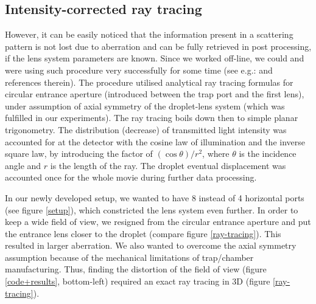 \documentclass[12pt,dvips]{elsarticle}
\begin{document}
\subsection{Intensity-corrected ray tracing} However, it can be easily noticed that the information present in a scattering
pattern is not lost due to aberration and can be fully retrieved in post processing, if the lens system parameters are
known. Since we worked off-line, we could and were using such procedure very successfully for some time (see e.g.:
\cite{RoP,liquids,HK-soft matter} and references therein). The procedure utilised analytical ray tracing formulas for
circular entrance aperture (introduced between the trap port and the first lens), under assumption of axial symmetry of
the droplet-lens system (which was fulfilled in our experiments). The ray tracing boils down then to simple planar
trigonometry. The distribution (decrease) of transmitted light intensity was accounted for at the detector with the cosine
law of illumination and the inverse square law, by introducing the factor of $(\cos \theta) /r^2$, where $\theta$ is the
incidence angle and $r$ is the length of the ray. The droplet eventual displacement was accounted once for the whole movie
during further data processing.

In our newly developed setup, we wanted to have 8 instead of 4 horizontal ports (see figure \ref{setup}), which
constricted the lens system even further. In order to keep a wide field of view, we resigned from the circular entrance
aperture and put the entrance lens closer to the droplet (compare figure \ref{ray-tracing}). This resulted in larger
aberration. We also wanted to overcome the axial symmetry assumption because of the mechanical limitations of trap/chamber
manufacturing. Thus, finding the distortion of the field of view (figure \ref{code+results}, bottom-left) required an
exact ray tracing in 3D (figure \ref{ray-tracing}).
\end{document}
